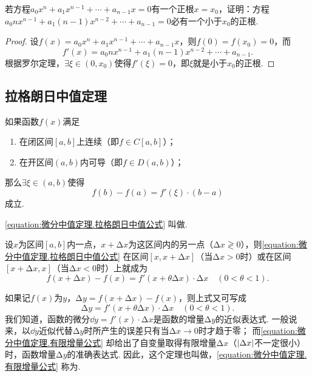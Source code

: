 \begin{example}
若方程\(a_0 x^n + a_1 x^{n-1} + \dotsb + a_{n-1} x = 0\)有一个正根\(x = x_0\)，证明：方程\(a_0 n x^{n-1} + a_1 (n-1) x^{n-2} + \dotsb + a_{n-1} = 0\)必有一个小于\(x_0\)的正根.
\begin{proof}
设\(f(x) = a_0 x^n + a_1 x^{n-1} + \dotsb + a_{n-1} x\)，则\(f(0) = f(x_0) = 0\)，而\[
f'(x) = a_0 n x^{n-1} + a_1 (n-1) x^{n-2} + \dotsb + a_{n-1}.
\]根据罗尔定理，\(\exists \xi \in (0,x_0)\)使得\(f'(\xi) = 0\)，即\(\xi\)就是小于\(x_0\)的正根.
\end{proof}
\end{example}

\subsection{拉格朗日中值定理}
\begin{theorem}[拉格朗日中值定理]\label{theorem:微分中值定理.拉格朗日中值定理}
如果函数\(f(x)\)满足
\begin{enumerate}
\item 在闭区间\([a,b]\)上连续（即\(f \in C[a,b]\)）；
\item 在开区间\((a,b)\)内可导（即\(f \in D(a,b)\)）；
\end{enumerate}
那么\(\exists \xi \in (a,b)\)使得
\begin{equation}\label{equation:微分中值定理.拉格朗日中值公式}
f(b)-f(a)=f'(\xi) \cdot (b-a)
\end{equation}
成立.
\end{theorem}
\cref{equation:微分中值定理.拉格朗日中值公式} 叫做.

设\(x\)为区间\([a,b]\)内一点，\(x+\increment x\)为这区间内的另一点（\(\increment x \gtrless 0\)），则\cref{equation:微分中值定理.拉格朗日中值公式} 在区间\([x,x+\increment x]\)（当\(\increment x>0\)时）或在区间\([x+\increment x,x]\)（当\(\increment x<0\)时）上就成为
\begin{equation}
f(x+\increment x) - f(x)
= f'(x+\theta \increment x) \cdot \increment x
\quad(0<\theta<1).
\end{equation}

如果记\(f(x)\)为\(y\)，\(\increment y = f(x+\increment x) - f(x)\)，则上式又可写成
\begin{equation}\label{equation:微分中值定理.有限增量公式}
\increment y = f'(x+\theta \increment x) \cdot \increment x
\quad(0<\theta<1).
\end{equation}
我们知道，函数的微分\(\dd{y} = f'(x) \cdot \increment x\)是函数的增量\(\increment y\)的近似表达式.
一般说来，以\(\dd{y}\)近似代替\(\increment y\)时所产生的误差只有当\(\increment x\to0\)时才趋于零；
而\cref{equation:微分中值定理.有限增量公式} 却给出了自变量取得有限增量\(\increment x\)（\(\abs{\Delta x}\)不一定很小）时，函数增量\(\increment y\)的准确表达式.
因此，这个定理也叫做，\cref{equation:微分中值定理.有限增量公式} 称为.

